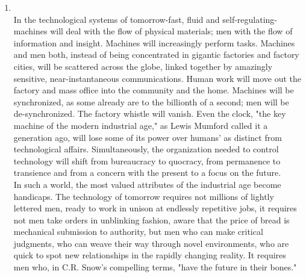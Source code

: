 \documentclass[12pt]{article}
\begin{document}
\begin{enumerate}
      In E-learning, the students study from home or any other place, that is most convenient for them. They can acquire learning material online. The study materials in online education could be texts, audio, notes, videos and images. Online learning has its various benefits. It is suitable for those who cannot visit or obtain the traditional education method for one reason or the other. Nearly 6.1 million college students are currently attending online courses, and this number is growing by around 30 percent yearly. Online education provides a myriad of advantages for people, as well as companies because it allows for, among others, flexibility. Online education’s potential advantages involve increased educational access; it provides a high-quality learning opportunity, improves student outcomes and skills, and expands educational choice options.

    \item {}\\
      In the technological systems of tomorrow-fast, fluid and self-regulating-machines will deal with the flow of physical materials; men with the flow of information and insight. Machines will increasingly perform tasks. Machines and men both, instead of being concentrated in gigantic factories and factory cities, will be scattered across the globe, linked together by amazingly sensitive, near-instantaneous communications. Human work will move out the factory and mass office into the community and the home. Machines will be synchronized, as some already are to the billionth of a second; men will be de-synchronized. The factory whistle will vanish. Even the clock, "the key machine of the modern industrial age," as Lewis Mumford called it a generation ago, will lose some of its power over humans' as distinct from technological affairs. Simultaneously, the organization needed to control technology will shift from bureaucracy to quocracy, from permanence to transience and from a concern with the present to a focus on the future.\\

      In such a world, the most valued attributes of the industrial age become handicaps. The technology of tomorrow requires not millions of lightly lettered men, ready to work in unison at endlessly repetitive jobs, it requires not men take orders in unblinking fashion, aware that the price of bread is mechanical submission to authority, but men who can make critical judgments, who can weave their way through novel environments, who are quick to spot new relationships in the rapidly changing reality. It requires men who, in C.R. Snow's compelling terms, "have the future in their bones."


\end{enumerate}
\end{document}
